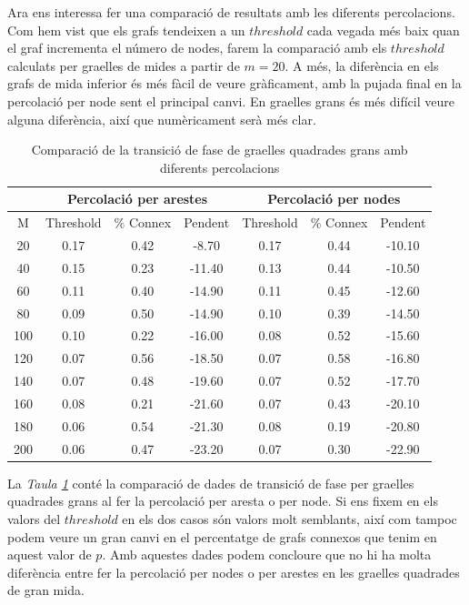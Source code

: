 \documentclass[a4paper]{article}
\begin{document}
	Ara ens interessa fer una comparació de resultats amb les diferents percolacions. Com hem vist que els grafs tendeixen a un $threshold$ cada vegada més baix quan el graf incrementa el número de nodes, farem la comparació amb els $threshold$ calculats per graelles de mides a partir de $m = 20$. A més, la diferència en els grafs de mida inferior és més fàcil de veure gràficament, amb la pujada final en la percolació per node sent el principal canvi. En graelles grans és més difícil veure alguna diferència, així que numèricament serà més clar. \\ 
	
	\begin{table} [H]
		\centering
		\begin{tabular}{|c|c|c|c|c|c|c|}
			\hline
			\rowcolor{gray!30}
			\multicolumn{1}{|c|}{} &\multicolumn{3}{|c|}{Percolació per arestes} & \multicolumn{3}{|c|}{Percolació per nodes} \\ \hline
			\rowcolor{gray!30}
			M & Threshold & \% Connex & Pendent & Threshold & \% Connex & Pendent \\ \hline
			20 & 0.17 & 0.42 & -8.70 & 0.17 & 0.44 & -10.10 \\ \hline
			40 & 0.15 & 0.23 & -11.40 & 0.13 & 0.44 & -10.50 \\ \hline
			60 & 0.11 & 0.40 & -14.90 & 0.11 & 0.45 & -12.60 \\ \hline
			80 & 0.09 & 0.50 & -14.90 & 0.10 & 0.39 & -14.50 \\ \hline
			100 & 0.10 & 0.22 & -16.00 & 0.08 & 0.52 & -15.60 \\ \hline
			120 & 0.07 & 0.56 & -18.50 & 0.07 & 0.58 & -16.80 \\ \hline
			140 & 0.07 & 0.48 & -19.60 & 0.07 & 0.52 & -17.70 \\ \hline
			160 & 0.08 & 0.21 & -21.60 & 0.07 & 0.43 & -20.10 \\ \hline
			180 & 0.06 & 0.54 & -21.30 & 0.08 & 0.19 & -20.80 \\ \hline
			200 & 0.06 & 0.47 & -23.20 & 0.07 & 0.30 & -22.90 \\ \hline
		\end{tabular}
		\caption{Comparació de la transició de fase de graelles quadrades grans amb diferents percolacions}
		\label{tab:comparacio_edges_nodes_square}
	\end{table}
	
	La \textit{Taula \ref{tab:comparacio_edges_nodes_square}} conté la comparació de dades de transició de fase per graelles quadrades grans al fer la percolació per aresta o per node. Si ens fixem en els valors del $threshold$ en els dos casos són valors molt semblants, així com tampoc podem veure un gran canvi en el percentatge de grafs connexos que tenim en aquest valor de $p$. Amb aquestes dades podem concloure que no hi ha molta diferència entre fer la percolació per nodes o per arestes en les graelles quadrades de gran mida.
	
\end{document}
